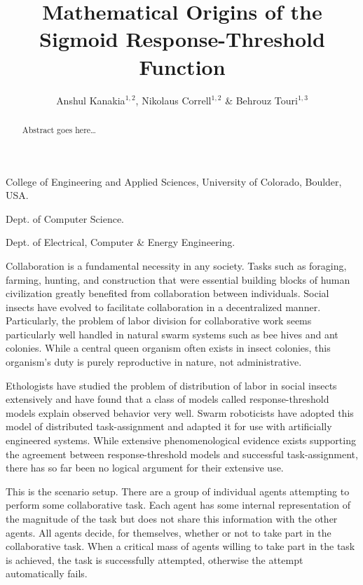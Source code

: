 \documentclass{nature}
\title{Mathematical Origins of the Sigmoid Response-Threshold Function}
\author{Anshul Kanakia$^{1,2}$, Nikolaus Correll$^{1,2}$ \& Behrouz Touri$^{1,3}$}
\begin{document}
\maketitle

\begin{affiliations}
 \item College of Engineering and Applied Sciences, University of Colorado, Boulder, USA. 
 \item Dept. of Computer Science.
 \item Dept. of Electrical, Computer \& Energy Engineering.
\end{affiliations}

\begin{abstract}
Abstract goes here\ldots
\end{abstract}

Collaboration is a fundamental necessity in any society. Tasks such as foraging, farming, hunting, and construction that were essential building blocks of human civilization greatly benefited from collaboration between individuals. Social insects have evolved to facilitate collaboration in a decentralized manner. Particularly, the problem of labor division for collaborative work seems particularly well handled in natural swarm systems such as bee hives and ant colonies. While a central queen organism often exists in insect colonies, this organism's duty is purely reproductive in nature, not administrative.



Ethologists have studied the problem of distribution of labor in social insects extensively and have found that a class of models called response-threshold models explain observed behavior very well. Swarm roboticists have adopted this model of distributed task-assignment and adapted it for use with artificially engineered systems. While extensive phenomenological evidence exists supporting the agreement between response-threshold models and successful task-assignment, there has so far been no logical argument for their extensive use. 

This is the scenario setup. There are a group of individual agents attempting to perform some collaborative task. Each agent has some internal representation of the magnitude of the task but does not share this information with the other agents. All agents decide, for themselves, whether or not to take part in the collaborative task. When a critical mass of agents willing to take part in the task is achieved, the task is successfully attempted, otherwise the attempt automatically fails.
\end{document}

